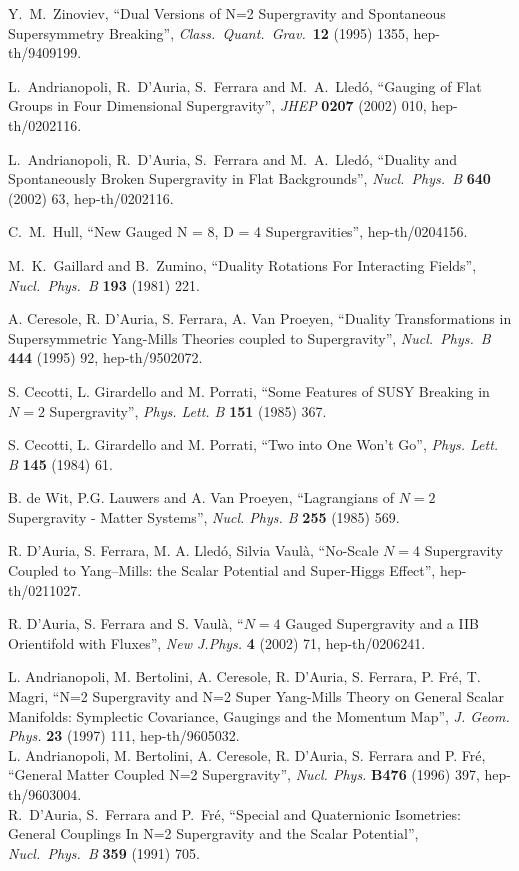 \documentclass[a4paper,12pt]{article}
\begin{document}
\begin{thebibliography}{99}
 Y.~M.~Zinoviev,
``Dual Versions of N=2 Supergravity and Spontaneous Supersymmetry Breaking'',
{\it Class.\ Quant.\ Grav.}\ {\bf 12} (1995) 1355, hep-th/9409199. 

 L.~Andrianopoli, R.~D'Auria, S.~Ferrara and M.~A.~Lled\'o,
``Gauging of Flat Groups in Four Dimensional Supergravity'',
{\it JHEP} {\bf 0207} (2002) 010,
hep-th/0202116. 

 L.~Andrianopoli, R.~D'Auria, S.~Ferrara and M.~A.~Lled\'o,
``Duality and Spontaneously Broken Supergravity in Flat Backgrounds'', 
{\it Nucl.\ Phys.\  B} {\bf 640} (2002) 63,
hep-th/0202116. 

C.~M.~Hull,
``New Gauged N = 8, D = 4 Supergravities'',
hep-th/0204156.



 M.~K.~Gaillard and B.~Zumino,
``Duality Rotations For Interacting Fields'', {\it Nucl.\ Phys.\ B} {\bf 193} (1981) 221.



A. Ceresole, R. D'Auria, S. Ferrara, A. Van Proeyen, 
``Duality Transformations in Supersymmetric Yang-Mills Theories coupled to Supergravity'',
{\it Nucl.\ Phys.\  B} {\bf 444} (1995) 92, hep-th/9502072.


S. Cecotti, L. Girardello and M. Porrati, ``Some Features of SUSY Breaking 
in $N=2$ Supergravity'', {\it
Phys. Lett. B} {\bf 151} (1985) 367.


S. Cecotti, L. Girardello and M. Porrati, ``Two into One Won't Go'', {\it
Phys. Lett. B} {\bf 145} (1984) 61.


 B. de Wit, P.G. Lauwers and  A. Van Proeyen, ``Lagrangians of $N=2$
Supergravity - Matter Systems'', {\it Nucl. Phys. B} {\bf 255} (1985) 569.
  



R. D'Auria, S. Ferrara, M. A. Lled\'o, Silvia Vaul\`a,
``No-Scale $N=4$ Supergravity Coupled to Yang--Mills: the Scalar Potential and Super-Higgs Effect'',
hep-th/0211027. 



R. D'Auria, S. Ferrara and S. Vaul\`a, ``$N=4$ Gauged Supergravity and a 
IIB Orientifold with Fluxes'', {\it New J.Phys.} {\bf 4} (2002) 71, hep-th/0206241.


L. Andrianopoli, M. Bertolini, A. Ceresole, R. D'Auria, S. Ferrara, P. Fr\'e, T. Magri,
``N=2 Supergravity and N=2 Super Yang-Mills Theory on General Scalar Manifolds: Symplectic Covariance, Gaugings and the Momentum Map'',
{\it  J. Geom. Phys.} {\bf 23} (1997) 111, hep-th/9605032.\\
L. Andrianopoli, M. Bertolini, A. Ceresole, R. D'Auria, S. Ferrara and P. Fr\'e, ``General Matter Coupled N=2 Supergravity'', {\it Nucl. Phys.}
{\bf  B476} (1996) 397, hep-th/9603004.\\
R.~D'Auria, S.~Ferrara and P.~Fr\'e,
``Special and Quaternionic Isometries: General Couplings In N=2 Supergravity and the Scalar Potential'',
{\it Nucl.\ Phys.\ B} {\bf 359} (1991) 705.





\end{thebibliography}
\end{document}
